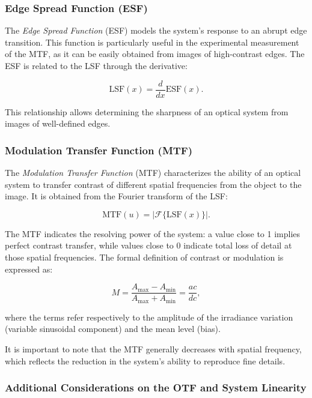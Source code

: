 \subsubsection{Edge Spread Function (ESF)}

The \textit{Edge Spread Function} (ESF) models the system's response to an abrupt edge transition. This function is particularly useful in the experimental measurement of the MTF, as it can be easily obtained from images of high-contrast edges. The ESF is related to the LSF through the derivative:

\begin{equation}
\text{LSF}(x) = \frac{d}{dx} \text{ESF}(x).
\end{equation}

This relationship allows determining the sharpness of an optical system from images of well-defined edges.

\subsubsection{Modulation Transfer Function (MTF)}

The \textit{Modulation Transfer Function} (MTF) characterizes the ability of an optical system to transfer contrast of different spatial frequencies from the object to the image. It is obtained from the Fourier transform of the LSF:

\begin{equation}
\text{MTF}(u) = \left| \mathcal{F} \{ \text{LSF}(x) \} \right|.
\end{equation}

The MTF indicates the resolving power of the system: a value close to 1 implies perfect contrast transfer, while values close to 0 indicate total loss of detail at those spatial frequencies. The formal definition of contrast or modulation is expressed as:

\begin{equation}
M = \frac{A_{\max} - A_{\min}}{A_{\max} + A_{\min}} = \frac{ac}{dc},
\end{equation}

where the terms refer respectively to the amplitude of the irradiance variation (variable sinusoidal component) and the mean level (bias).

It is important to note that the MTF generally decreases with spatial frequency, which reflects the reduction in the system’s ability to reproduce fine details.

\subsubsection{Additional Considerations on the OTF and System Linearity}

